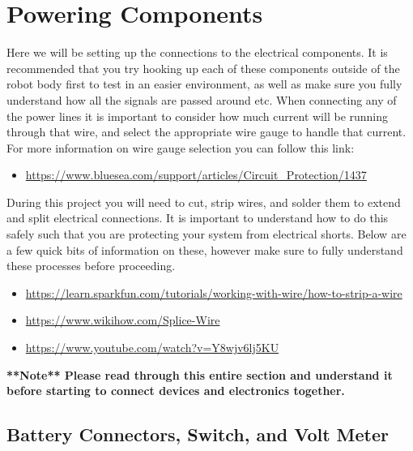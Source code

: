 \documentclass[12pt]{article}
\begin{document}
\section{Powering Components}
Here we will be setting up the connections to the electrical components. It is recommended that you try hooking up each of these components outside of the robot body first to test in an easier environment, as well as make sure you fully understand how all the signals are passed around etc. When connecting any of the power lines it is important to consider how much current will be running through that wire, and select the appropriate wire gauge to handle that current. For more information on wire gauge selection you can follow this link:
  
\begin{itemize}
	\item \href{https://www.bluesea.com/support/articles/Circuit_Protection/1437/Part_1\%3A_Choosing_the_Correct_Wire_Size_for_a_DC_Circuit}{https://www.bluesea.com/support/articles/Circuit\_Protection/1437}
\end{itemize}

\noindent During this project you will need to cut, strip wires, and solder them to extend and split electrical connections. It is important to understand how to do this safely such that you are protecting your system from electrical shorts. Below are a few quick bits of information on these, however make sure to fully understand these processes before proceeding. 

\begin{itemize}
	\item \href{https://learn.sparkfun.com/tutorials/working-with-wire/how-to-strip-a-wire}{https://learn.sparkfun.com/tutorials/working-with-wire/how-to-strip-a-wire}
	\item \href{https://www.wikihow.com/Splice-Wire}{https://www.wikihow.com/Splice-Wire}
	\item \href{https://www.youtube.com/watch?v=Y8wjv6lj5KU}{https://www.youtube.com/watch?v=Y8wjv6lj5KU}
\end{itemize}

 \textbf{**Note** Please read through this entire section and understand it before starting to connect devices and electronics together. }

\subsection{Battery Connectors, Switch, and Volt Meter}
\end{document}
